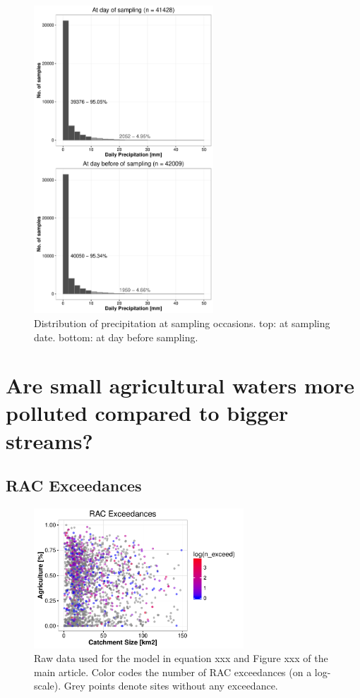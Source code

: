 \documentclass[pdftex,a4paper]{scrreprt}
\begin{document}
\begin{figure}[h]
	\centering
	\includegraphics[width = 0.6\textwidth]{precip}
	\caption{Distribution of precipitation at sampling occasions. top: at sampling date. bottom: at day before sampling.}
	\label{fig:precip}
\end{figure}




\chapter{Are small agricultural waters more polluted compared to bigger streams?}

\section{RAC Exceedances}
\begin{figure}[h]
	\centering
	\includegraphics[width = 0.7\textwidth]{ezgagrirac}
	\caption{Raw data used for the model in equation xxx and Figure xxx of the main article. Color codes the number of RAC exceedances (on a log-scale). Grey points denote sites without any exceedance.}
	\label{fig:ezgagrirac}
\end{figure}



\end{document}
